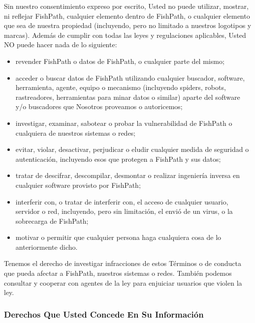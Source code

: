 \documentclass[
  11pt,
]{book}
\providecommand{\tightlist}{%
  \setlength{\itemsep}{0pt}\setlength{\parskip}{0pt}}
\begin{document}
Sin nuestro consentimiento expreso por escrito, Usted no puede utilizar, mostrar, ni reflejar FishPath, cualquier elemento dentro de FishPath, o cualquier elemento que sea de nuestra propiedad (incluyendo, pero no limitado a nuestros logotipos y marcas). Además de cumplir con todas las leyes y regulaciones aplicables, Usted NO puede hacer nada de lo siguiente:

\begin{itemize}
\tightlist
\item
  revender FishPath o datos de FishPath, o cualquier parte del mismo;
\item
  acceder o buscar datos de FishPath utilizando cualquier buscador, software, herramienta, agente, equipo o mecanismo (incluyendo spiders, robots, rastreadores, herramientas para minar datos o similar) aparte del software y/o buscadores que Nosotros proveamos o autoricemos;
\item
  investigar, examinar, sabotear o probar la vulnerabilidad de FishPath o cualquiera de nuestros sistemas o redes;
\item
  evitar, violar, desactivar, perjudicar o eludir cualquier medida de seguridad o autenticación, incluyendo esos que protegen a FishPath y sus datos;
\item
  tratar de descifrar, descompilar, desmontar o realizar ingeniería inversa en cualquier software provisto por FishPath;
\item
  interferir con, o tratar de interferir con, el acceso de cualquier usuario, servidor o red, incluyendo, pero sin limitación, el envió de un virus, o la sobrecarga de FishPath;
\item
  motivar o permitir que cualquier persona haga cualquiera cosa de lo anteriormente dicho.
\end{itemize}

Tenemos el derecho de investigar infracciones de estos Términos o de conducta que pueda afectar a FishPath, nuestros sistemas o redes. También podemos consultar y cooperar con agentes de la ley para enjuiciar usuarios que violen la ley.

\hypertarget{derechos-que-usted-concede-en-su-informaciuxf3n}{%
\subsubsection*{Derechos Que Usted Concede En Su Información}\label{derechos-que-usted-concede-en-su-informaciuxf3n}}
\end{document}
